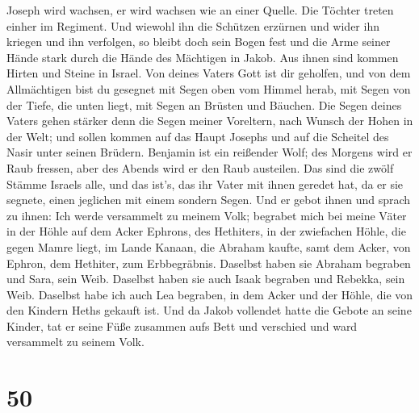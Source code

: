 Joseph wird wachsen, er wird wachsen wie an einer Quelle.
Die Töchter treten einher im Regiment.  Und wiewohl ihn die
Schützen erzürnen und wider ihn kriegen und ihn verfolgen, 
so bleibt doch sein Bogen fest und die Arme seiner Hände stark durch die
Hände des Mächtigen in Jakob. Aus ihnen sind kommen Hirten und Steine in
Israel.  Von deines Vaters Gott ist dir geholfen, und von
dem Allmächtigen bist du gesegnet mit Segen oben vom Himmel herab, mit
Segen von der Tiefe, die unten liegt, mit Segen an Brüsten und Bäuchen.
 Die Segen deines Vaters gehen stärker denn die Segen
meiner Voreltern, nach Wunsch der Hohen in der Welt; und sollen kommen
auf das Haupt Josephs und auf die Scheitel des Nasir unter seinen
Brüdern.  Benjamin ist ein reißender Wolf; des Morgens wird
er Raub fressen, aber des Abends wird er den Raub austeilen.
 Das sind die zwölf Stämme Israels alle, und das ist's, das
ihr Vater mit ihnen geredet hat, da er sie segnete, einen jeglichen mit
einem sondern Segen.  Und er gebot ihnen und sprach zu
ihnen: Ich werde versammelt zu meinem Volk; begrabet mich bei meine
Väter in der Höhle auf dem Acker Ephrons, des Hethiters, 
in der zwiefachen Höhle, die gegen Mamre liegt, im Lande Kanaan, die
Abraham kaufte, samt dem Acker, von Ephron, dem Hethiter, zum
Erbbegräbnis.  Daselbst haben sie Abraham begraben und
Sara, sein Weib. Daselbst haben sie auch Isaak begraben und Rebekka,
sein Weib. Daselbst habe ich auch Lea begraben,  in dem
Acker und der Höhle, die von den Kindern Heths gekauft ist.
 Und da Jakob vollendet hatte die Gebote an seine Kinder,
tat er seine Füße zusammen aufs Bett und verschied und ward versammelt
zu seinem Volk.

\hypertarget{section-49}{%
\section{50}\label{section-49}}

